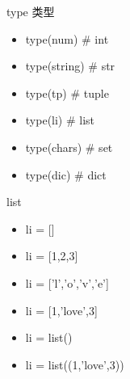 \documentclass[aspectratio=169]{beamer}
\begin{document}
    \begin{frame}{type 类型}
      \begin{itemize}
        \item type(num) \# int
        \item type(string) \# str
        \item type(tp) \# tuple
        \item type(li) \# list
        \item type(chars) \# set
        \item type(dic) \# dict
      \end{itemize}
      
    \end{frame}

    \begin{frame}{list}
      \begin{itemize}
        \item li = []
        \item li = [1,2,3]
        \item li = ['l','o','v','e']
        \item li = [1,'love',3]
        \item li = list()
        \item li = list((1,'love',3))
      \end{itemize}
      
    \end{frame}

    
\end{document}
